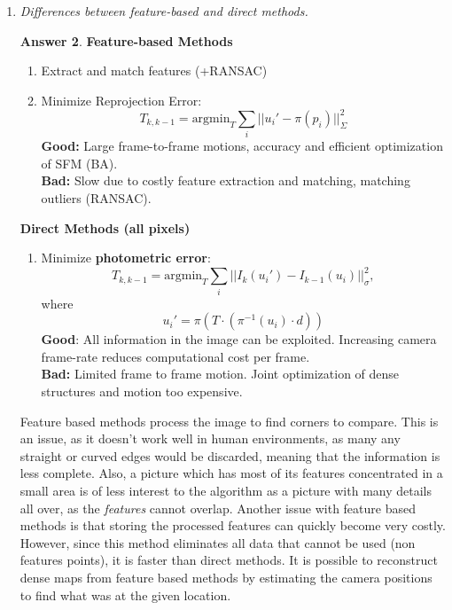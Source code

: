 \documentclass[a4paper,12 pt]{article}
\theoremstyle{definition}
\theoremstyle{remark}
\theoremstyle{definition}
\theoremstyle{definition}
\theoremstyle{definition}
\theoremstyle{definition}
\theoremstyle{remark}
\theoremstyle{remark}
\theoremstyle{definition}
\theoremstyle{definition}
\newtheorem*{answer}{Answer}
\begin{document}
\begin{enumerate}
\begin{answer}
\begin{itemize}
\item LSD-SLAM: Direct (photometric error) + Semi-Dense formulation, includes loop closing, relocalization, final optimization, real time
\item DSO: Direct (photometric error) + Sparse formulation, real time, BA sliding window
\item SVO: Direct (minimizes photometric error), Feature-based (minimizes reprojection error), mapping, real time fast
\end{itemize}
\end{answer}
\item \textit{Differences between feature-based and direct methods.}
\begin{answer}
\textbf{Feature-based Methods}
\begin{enumerate}
\item Extract and match features (+RANSAC)
\item Minimize Reprojection Error:
\begin{equation}
T_{k,k-1}=\text{argmin}_T\sum_{i}||u_i'-\pi(p_i)||_\Sigma^2
\end{equation}
\textbf{Good:} Large frame-to-frame motions, accuracy and efficient optimization of SFM (BA).\\
\textbf{Bad:} Slow due to costly feature extraction and matching, matching outliers (RANSAC).
\end{enumerate}
\textbf{Direct Methods (all pixels)}
\begin{enumerate}
\item Minimize \textbf{photometric error}:
\begin{equation}
T_{k,k-1}=\text{argmin}_T\sum_{i}||I_k(u_i')-I_{k-1}(u_i)||_\sigma^2,
\end{equation}
where
\begin{equation}
u_i'=\pi(T\cdot (\pi^{-1}(u_i)\cdot d))
\end{equation}
\textbf{Good}: All information in the image can be exploited. Increasing camera frame-rate reduces computational cost per frame.\\
\textbf{Bad:} Limited frame to frame motion. Joint optimization of dense structures and motion too expensive.
\end{enumerate}
Feature based methods process the image to find corners to compare. This is an issue, as it doesn't work well in human environments, as many any straight or curved edges would be discarded, meaning that the information is less complete. Also, a picture which has most of its features concentrated in a small area is of less interest to the algorithm as a picture with many details all over, as the \textit{features} cannot overlap. Another issue with feature based methods is that storing the processed features can quickly become very costly. However, since this method eliminates all data that cannot be used (non features points), it is faster than direct methods. It is possible to reconstruct dense maps from feature based methods by estimating the camera positions to find what was at the given location.\\ \\

\end{answer}
\end{enumerate}
\end{document}
